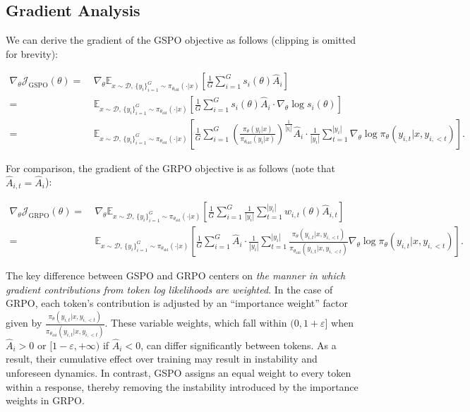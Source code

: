 \subsection{Gradient Analysis}
\label{subsec:gradient}

We can derive the gradient of the GSPO objective as follows (clipping is omitted for brevity):

\begin{align}
\nabla_{\theta} \mathcal{J}_\text{GSPO} (\theta)
=&\ 
\nabla_{\theta} \mathbb{E}_{ x \sim \mathcal{D},\, \{y_i\}_{i=1}^G \sim \pi_{\theta_\text{old}}( \cdot | x) }
\left[ 
\frac{1}{G} \sum_{i=1}^{G} s_{i}(\theta) \widehat{A}_{i}
\right] \\
= &\ 
\mathbb{E}_{ x \sim \mathcal{D},\, \{y_i\}_{i=1}^G \sim \pi_{\theta_\text{old}}( \cdot | x) }
\left[ 
\frac{1}{G} \sum_{i=1}^{G}
s_{i}(\theta) \widehat{A}_{i}
\cdot \nabla_{\theta} \log s_{i}(\theta)
\right] \\
=&\ 
\mathbb{E}_{ x \sim \mathcal{D},\, \{y_i\}_{i=1}^G \sim \pi_{\theta_\text{old}}( \cdot | x) }
\left[ 
\frac{1}{G} \sum_{i=1}^{G} 
\left( \frac{ \pi_{\theta} (y_i | x) }{ \pi_{\theta_\text{old}} (y_i | x)} \right)^{\frac{1}{|y_i|}} \widehat{A}_{i} 
\cdot \frac{1}{|y_i|} \sum_{t=1}^{|y_i|} \nabla_{\theta} \log \pi_{\theta} (y_{i,t} | x, y_{i,<t}) 
\right].
\label{equ:gspo_grad}
\end{align}

For comparison, the gradient of the GRPO objective is as follows (note that $\widehat{A}_{i,t} = \widehat{A}_{i}$):

\begin{align}
\nabla_{\theta} \mathcal{J}_\text{GRPO} (\theta) 
=&\ 
\nabla_{\theta} \mathbb{E}_{ x \sim \mathcal{D},\, \{y_i\}_{i=1}^G \sim \pi_{\theta_\text{old}}( \cdot | x) }
\left[ \frac{1}{G} \sum_{i=1}^{G} \frac{1}{|y_i|} \sum_{t=1}^{|y_i|} 
w_{i,t}(\theta) \widehat{A}_{i,t}
\right] \\
=&\
\mathbb{E}_{ x \sim \mathcal{D},\, \{y_i\}_{i=1}^G \sim \pi_{\theta_\text{old}}( \cdot | x) }
\left[ \frac{1}{G} \sum_{i=1}^{G} \widehat{A}_{i} 
\cdot \frac{1}{|y_i|} \sum_{t=1}^{|y_i|} 
\frac{ \pi_{\theta} (y_{i,t} | x, y_{i,<t}) }{ \pi_{\theta_\text{old}} (y_{i,t} | x,y_{i,<t})} 
\nabla_{\theta} \log \pi_{\theta} (y_{i,t} | x, y_{i,<t})  
\right].
\end{align}

The key difference between GSPO and GRPO centers on \textit{the manner in which gradient contributions from token log likelihoods are weighted}. In the case of GRPO, each token’s contribution is adjusted by an ``importance weight'' factor given by $\frac{ \pi_{\theta} (y_{i,t} | x, y_{i,<t}) }{ \pi_{\theta_\text{old}} (y_{i,t} | x,y_{i,<t})}$. These variable weights, which fall within $(0, 1+\varepsilon]$ when $\widehat{A}_{i} >0$ or $[1-\varepsilon, +\infty)$ if $\widehat{A}_{i} < 0$, can differ significantly between tokens. As a result, their cumulative effect over training may result in instability and unforeseen dynamics. In contrast, GSPO assigns an equal weight to every token within a response, thereby removing the instability introduced by the importance weights in GRPO.

